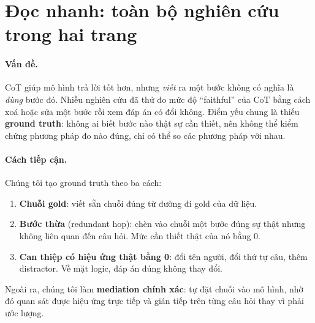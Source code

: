 \documentclass[11pt]{article}
\begin{document}
\tableofcontents
\newpage

\section{Đọc nhanh: toàn bộ nghiên cứu trong hai trang}

\paragraph{Vấn đề.} CoT giúp mô hình trả lời tốt hơn, nhưng \emph{viết} ra một bước không có nghĩa
là \emph{dùng} bước đó. Nhiều nghiên cứu đã thử đo mức độ ``faithful'' của CoT bằng cách xoá hoặc
sửa một bước rồi xem đáp án có đổi không. Điểm yếu chung là thiếu \textbf{ground truth}: không ai
biết bước nào thật sự cần thiết, nên không thể kiểm chứng phương pháp đo nào đúng, chỉ có thể so
các phương pháp với nhau.

\paragraph{Cách tiếp cận.} Chúng tôi tạo ground truth theo ba cách:
\begin{enumerate}[leftmargin=*,itemsep=1pt]
\item \textbf{Chuỗi gold}: viết sẵn chuỗi đúng từ đường đi gold của dữ liệu.
\item \textbf{Bước thừa} (redundant hop): chèn vào chuỗi một bước đúng sự thật nhưng không liên
  quan đến câu hỏi. Mức cần thiết thật của nó bằng 0.
\item \textbf{Can thiệp có hiệu ứng thật bằng 0}: đổi tên người, đổi thứ tự câu, thêm distractor.
  Về mặt logic, đáp án đúng không thay đổi.
\end{enumerate}
Ngoài ra, chúng tôi làm \textbf{mediation chính xác}: tự đặt chuỗi vào mô hình, nhờ đó quan sát
được hiệu ứng trực tiếp và gián tiếp trên từng câu hỏi thay vì phải ước lượng.
\end{document}
